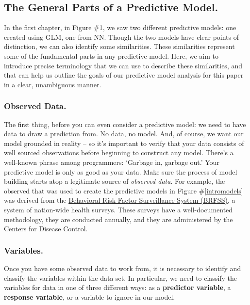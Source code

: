 \documentclass[12pt]{article}\usepackage[]{graphicx}\usepackage[]{color}
\begin{document}
\subsection{The General Parts of a Predictive Model.}
	In the first chapter, in Figure \#1, we saw two different predictive models:  one created using GLM, one from NN.  Though the two models
have clear points of distinction, we can also identify some similarities.  These similarities represent some of the fundamental parts in any
predictive model.  Here, we aim to introduce precise terminology that we can use to describe these similarities, and that can help us outline the
goals of our predictive model analysis for this paper in a clear, unambiguous manner.

	\subsubsection{Observed Data.}
	The first thing, before you can even consider a predictive model:  we need to have data to draw a prediction from.  No data, no model.  And,
of course, we want our model grounded in reality -- so it's important to verify that your data consists of well sourced observations before 
beginning to construct any model.  There's a well-known phrase among programmers:  `Garbage in, garbage out.'  Your predictive model is only as 
good as your data.  Make sure the process of model building starts atop a legitimate source of \textit{observed data}.  For example, the observed that was used to create the predictive models in Figure \#\ref{intromodels} was derived from the \href{https://www.cdc.gov/brfss/index.html}{Behavioral Risk Factor Surveillance System (BRFSS)}, a system of nation-wide health surveys.  These surveys have a well-documented methodology, they are conducted annually, and they are administered by the Centers for Disease Control.

	\subsubsection{Variables.}
	Once you have some observed data to work from, it is necessary to identify and classify the variables within the data set.  In particular, we 
need to classify the variables for data in one of three different ways: as a \textbf{predictor variable}, a \textbf{response variable}, or a variable to ignore in our model.  
\end{document}
